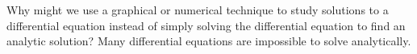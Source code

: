 {
Why might we use a graphical or numerical technique to study solutions to a differential equation instead of simply solving the differential equation to find an analytic solution?
}
{
Many differential equations are impossible to solve analytically.
}
